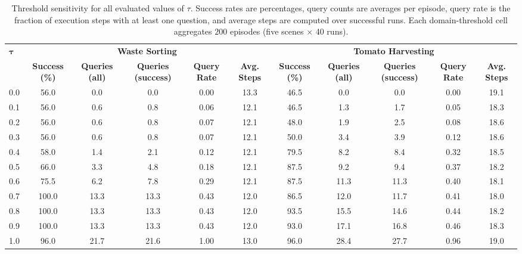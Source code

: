 \begin{table}[t]
\centering
\caption{Threshold sensitivity for all evaluated values of $\tau$. Success rates are percentages, query counts are averages per episode, query rate is the fraction of execution steps with at least one question, and average steps are computed over successful runs. Each domain-threshold cell aggregates $200$ episodes (five scenes $\times$ 40 runs).}
\label{tab:sys_tau}
\footnotesize
\setlength{\tabcolsep}{2pt}
\begin{tabular*}{\textwidth}{@{\extracolsep{\fill}}lcccccccccc}
\toprule
\multirow{2}{*}{$\boldsymbol{\tau}$} & \multicolumn{5}{c}{\textbf{Waste Sorting}} & \multicolumn{5}{c}{\textbf{Tomato Harvesting}} \\
\cmidrule(lr){2-6}\cmidrule(lr){7-11}
& \textbf{Success (\%)} & \textbf{Queries (all)} & \textbf{Queries (success)} & \textbf{Query Rate} & \textbf{Avg. Steps} & \textbf{Success (\%)} & \textbf{Queries (all)} & \textbf{Queries (success)} & \textbf{Query Rate} & \textbf{Avg. Steps} \\
\midrule
0.0 & 56.0 & 0.0 & 0.0 & 0.00 & 13.3 & 46.5 & 0.0 & 0.0 & 0.00 & 19.1 \\
0.1 & 56.0 & 0.6 & 0.8 & 0.06 & 12.1 & 46.5 & 1.3 & 1.7 & 0.05 & 18.3 \\
0.2 & 56.0 & 0.6 & 0.8 & 0.07 & 12.1 & 48.0 & 1.9 & 2.5 & 0.08 & 18.6 \\
0.3 & 56.0 & 0.6 & 0.8 & 0.07 & 12.1 & 50.0 & 3.4 & 3.9 & 0.12 & 18.6 \\
0.4 & 58.0 & 1.4 & 2.1 & 0.12 & 12.1 & 79.5 & 8.2 & 8.4 & 0.32 & 18.5 \\
0.5 & 66.0 & 3.3 & 4.8 & 0.18 & 12.1 & 87.5 & 9.2 & 9.4 & 0.37 & 18.2 \\
0.6 & 75.5 & 6.2 & 7.8 & 0.29 & 12.1 & 87.5 & 11.3 & 11.3 & 0.40 & 18.1 \\
0.7 & 100.0 & 13.3 & 13.3 & 0.43 & 12.0 & 86.5 & 12.0 & 11.7 & 0.41 & 18.0 \\
0.8 & 100.0 & 13.3 & 13.3 & 0.43 & 12.0 & 93.5 & 15.5 & 14.6 & 0.44 & 18.2 \\
0.9 & 100.0 & 13.3 & 13.3 & 0.43 & 12.0 & 93.0 & 17.1 & 16.8 & 0.46 & 18.3 \\
1.0 & 96.0 & 21.7 & 21.6 & 1.00 & 13.0 & 96.0 & 28.4 & 27.7 & 0.96 & 19.0 \\
\bottomrule
\end{tabular*}
\end{table}
